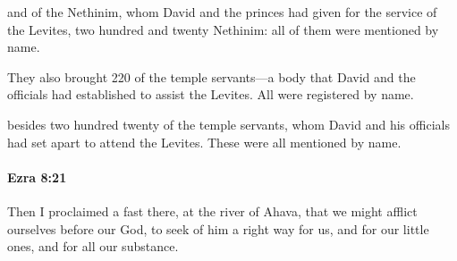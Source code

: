 			\begin{versebox}
					\item[BHS] 
					\item[LXX] 
					\item[ASV] and of the Nethinim, whom David and the princes had given for the service of the Levites, two hundred and twenty Nethinim: all of them were mentioned by name.
					\item[NIV] They also brought 220 of the temple servants—a body that David and the officials had established to assist the Levites. All were registered by name.
					\item[NRSV] besides two hundred twenty of the temple servants, whom David and his officials had set apart to attend the Levites. These were all mentioned by name.
			\end{versebox}

		\paragraph{Ezra 8:21} %
			\label{EZRA-8-21}

			Then I proclaimed a fast there, at the river of Ahava, that we might afflict ourselves before our God, to seek of him a right way for us, and for our little ones, and for all our substance.


